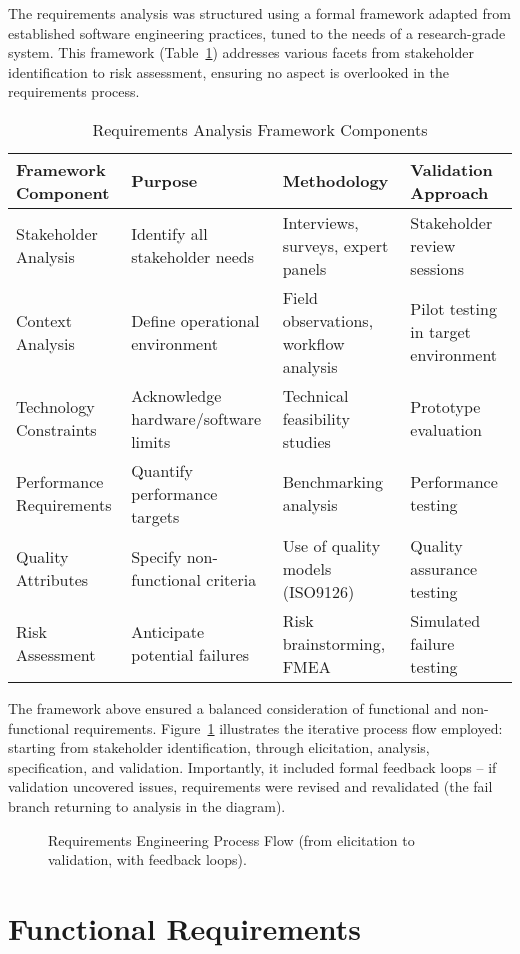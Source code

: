 \documentclass[11pt,a4paper]{report}
\begin{document}
The requirements analysis was structured using a formal framework adapted from established software engineering practices, tuned to the needs of a research-grade system. This framework (Table~\ref{tab:req_framework}) addresses various facets from stakeholder identification to risk assessment, ensuring no aspect is overlooked in the requirements process. \begin{table}[h]
\centering
\caption{Requirements Analysis Framework Components}
\label{tab:req_framework}
\begin{tabular}{p{3.5cm}p{4.2cm}p{4.2cm}p{3.8cm}}
\toprule
\textbf{Framework Component} & \textbf{Purpose} & \textbf{Methodology} & \textbf{Validation Approach} \\
\midrule
Stakeholder Analysis & Identify all stakeholder needs & Interviews, surveys, expert panels & Stakeholder review sessions \\
Context Analysis & Define operational environment & Field observations, workflow analysis & Pilot testing in target environment \\
Technology Constraints & Acknowledge hardware/software limits & Technical feasibility studies & Prototype evaluation \\
Performance Requirements & Quantify performance targets & Benchmarking analysis & Performance testing \\
Quality Attributes & Specify non-functional criteria & Use of quality models (ISO9126) & Quality assurance testing \\
Risk Assessment & Anticipate potential failures & Risk brainstorming, FMEA & Simulated failure testing \\
\bottomrule
\end{tabular}
\end{table} The framework above ensured a balanced consideration of functional and non-functional requirements. Figure~\ref{fig:req_process_flow} illustrates the iterative process flow employed: starting from stakeholder identification, through elicitation, analysis, specification, and validation. Importantly, it included formal feedback loops -- if validation uncovered issues, requirements were revised and revalidated (the fail branch returning to analysis in the diagram). %
\begin{figure}[h]
\centering
\fbox{\rule{0pt}{0.25\textheight}\rule{0.8\textwidth}{0pt}}
\caption{Requirements Engineering Process Flow (from elicitation to validation, with feedback loops).}
\label{fig:req_process_flow}
\end{figure} \section{Functional Requirements}
\end{document}
